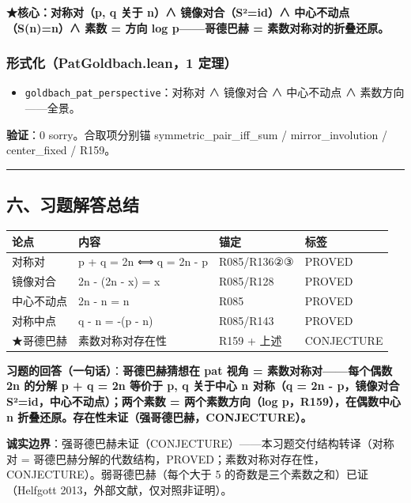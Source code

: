 \documentclass[
]{article}
\newcounter{none} %
\providecommand{\tightlist}{%
  \setlength{\itemsep}{0pt}\setlength{\parskip}{0pt}}
\begin{document}
\textbf{★核心：对称对（p, q 关于 n）∧ 镜像对合（S²=id）∧
中心不动点（S(n)=n）∧ 素数 = 方向 log p------哥德巴赫 =
素数对称对的折叠还原。}

\subsubsection{形式化（PatGoldbach.lean，1
定理）}\label{ux5f62ux5f0fux5316patgoldbach.lean1-ux5b9aux7406-3}

\begin{itemize}
\tightlist
\item
  \texttt{goldbach\_pat\_perspective}：对称对 ∧ 镜像对合 ∧ 中心不动点 ∧
  素数方向------全景。
\end{itemize}

\textbf{验证}：0 sorry。合取项分别锚 symmetric\_pair\_iff\_sum /
mirror\_involution / center\_fixed / R159。

\begin{center}\rule{0.5\linewidth}{0.5pt}\end{center}

\subsection{六、习题解答总结}\label{ux516dux4e60ux9898ux89e3ux7b54ux603bux7ed3}

{\def\LTcaptype{none} %
\begin{longtable}[]{@{}llll@{}}
\toprule\noalign{}
论点 & 内容 & 锚定 & 标签 \\
\midrule\noalign{}
\endhead
\bottomrule\noalign{}
\endlastfoot
对称对 & p + q = 2n ⟺ q = 2n - p & R085/R136②③ & PROVED \\
镜像对合 & 2n - (2n - x) = x & R085/R128 & PROVED \\
中心不动点 & 2n - n = n & R085 & PROVED \\
对称中点 & q - n = -(p - n) & R085/R143 & PROVED \\
★哥德巴赫 & 素数对称对存在性 & R159 + 上述 & CONJECTURE \\
\end{longtable}
}

\textbf{习题的回答（一句话）}：\textbf{哥德巴赫猜想在 pat 视角 =
素数对称对------每个偶数 2n 的分解 p + q = 2n 等价于 p, q 关于中心 n
对称（q = 2n - p，镜像对合 S²=id，中心不动点）；两个素数 =
两个素数方向（log p，R159），在偶数中心 n
折叠还原。存在性未证（强哥德巴赫，CONJECTURE）。}

\textbf{诚实边界}：强哥德巴赫未证（CONJECTURE）------本习题交付结构转译（对称对
=
哥德巴赫分解的代数结构，PROVED；素数对称对存在性，CONJECTURE）。弱哥德巴赫（每个大于
5 的奇数是三个素数之和）已证（Helfgott 2013，外部文献，仅对照非证明）。
\end{document}
